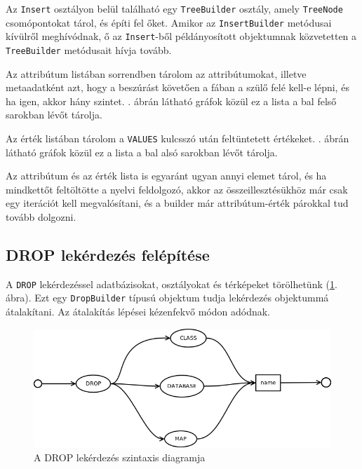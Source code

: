 Az \texttt{Insert} osztályon belül található egy \texttt{TreeBuilder} osztály, amely \texttt{TreeNode} csomópontokat tárol, és építi fel őket.
Amikor az \texttt{InsertBuilder} metódusai kívülről meghívódnak, ő az \texttt{Insert}-ből példányosított objektumnak közvetetten a \texttt{TreeBuilder} metódusait hívja tovább.

Az attribútum listában sorrendben tárolom az attribútumokat, illetve metaadatként azt, hogy a beszúrást követően a fában a szülő felé kell-e lépni, és ha igen, akkor hány szintet. . ábrán látható gráfok közül ez a lista a bal felső sarokban lévőt tárolja.

Az érték listában tárolom a \texttt{VALUES} kulcsszó után feltüntetett értékeket. . ábrán látható gráfok közül ez a lista a bal alsó sarokban lévőt tárolja.

Az attribútum és az érték lista is egyaránt ugyan annyi elemet tárol, és ha mindkettőt feltöltötte a nyelvi feldolgozó, akkor az összeillesztésükhöz már csak egy iterációt kell megvalósítani, és a builder már attribútum-érték párokkal tud tovább dolgozni.

\subsection{DROP lekérdezés felépítése}

A \texttt{DROP} lekérdezéssel adatbázisokat, osztályokat és térképeket törölhetünk (\ref{fig:dropSytnax}. ábra). Ezt egy \texttt{DropBuilder} típusú objektum tudja lekérdezés objektummá átalakítani. Az átalakítás lépései kézenfekvő módon adódnak.

\begin{figure}[htb]
	\begin{center}
		\includegraphics[scale=0.4]{images/drop}
		\caption{A DROP lekérdezés szintaxis diagramja}
		\label{fig:dropSytnax}
	\end{center}
\end{figure}

